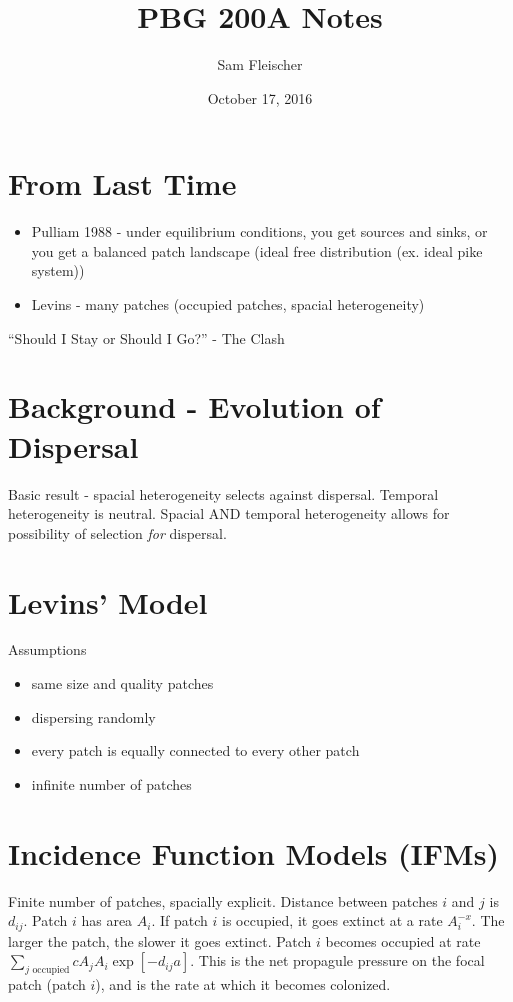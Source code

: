 \documentclass{article}
\title{PBG 200A Notes}
\author{Sam Fleischer}
\date{October 17, 2016}
\begin{document}
    \maketitle

    \section{From Last Time}
        \begin{itemize}
            \item Pulliam 1988 - under equilibrium conditions, you get sources and sinks, or you get a balanced patch landscape (ideal free distribution (ex. ideal pike system))
            \item Levins - many patches (occupied patches, spacial heterogeneity)
        \end{itemize}
        ``Should I Stay or Should I Go?'' - The Clash

    \section{Background - Evolution of Dispersal}
        Basic result - spacial heterogeneity selects against dispersal.  Temporal heterogeneity is neutral.  Spacial AND temporal heterogeneity allows for possibility of selection \emph{for} dispersal.

    \section{Levins' Model}
        Assumptions
        \begin{itemize}
            \item same size and quality patches
            \item dispersing randomly
            \item every patch is equally connected to every other patch
            \item infinite number of patches
        \end{itemize}

    \section{Incidence Function Models (IFMs)}
        Finite number of patches, spacially explicit.  Distance between patches $i$ and $j$ is $d_{ij}$.  Patch $i$ has area $A_i$.  If patch $i$ is occupied, it goes extinct at a rate $A_i^{-x}$.  The larger the patch, the slower it goes extinct.  Patch $i$ becomes occupied at rate $\displaystyle\sum_{j \text{ occupied}} cA_jA_i\exp[-d_{ij}a]$.  This is the net propagule pressure on the focal patch (patch $i$), and is the rate at which it becomes colonized.
\end{document}
